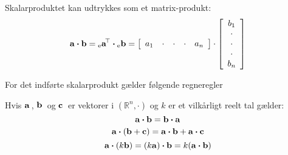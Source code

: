 \begin{think}
Skalarproduktet kan udtrykkes som et matrix-produkt:
\begin{equation}
\mathbf{a} \bm{\cdot} \mathbf{b} = {_{\rm{e}}\mathbf{a}}\hspace*{-.6mm}^{\top} \bm{\cdot} {_{\rm{e}}\mathbf{b}} =
\left[
  \begin{array}{ccccc}
    a_{1} & \cdot & \cdot & \cdot& a_{n} \\
  \end{array}
\right]  \cdot  \left[
                                                                                          \begin{array}{c}
                                                                                            b_{1} \\
                                                                                            \cdot \\
                                                                                            \cdot \\
                                                                                            \cdot \\
                                                                                            b_{n} \\
                                                                                          \end{array}
                                                                                        \right]
\end{equation}
\end{think}

For det indførte skalarprodukt gælder følgende regneregler

\begin{theorem}\label{reglerSkalarProd}
Hvis $\mathbf{a}\,$, $\mathbf{b}\,$ og $\mathbf{c}\,$ er vektorer i $(\mathbb{R}^{n}, \bm{\cdot})$ og $k$ er et vilkårligt reelt tal gælder:
\begin{equation}\label{RR1}
\mathbf{a} \bm{\cdot} \mathbf{b} = \mathbf{b} \bm{\cdot} \mathbf{a}
\end{equation}
\vspace{-0.7cm}
\begin{equation}\label{RR2}
\mathbf{a} \bm{\cdot} (\mathbf{b}+\mathbf{c}) = \mathbf{a}\bm{\cdot}\mathbf{b}+ \mathbf{a}\bm{\cdot} \mathbf{c}
\end{equation}
\vspace{-0.5cm}
\begin{equation}\label{RR3}
\mathbf{a}\bm{\cdot}(k\mathbf{b})=(k\mathbf{a})\bm{\cdot}\mathbf{b}=k(\mathbf{a}\bm{\cdot}\mathbf{b})
\end{equation}
\end{theorem}

